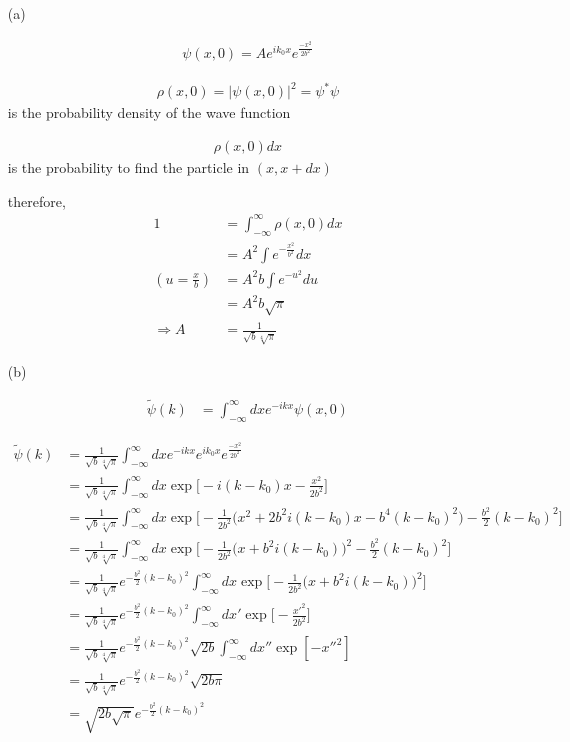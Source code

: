 \documentclass[11pt,a4paper]{article}
\begin{document}
\begin{enumerate}
\item[(a)]

\begin{align}
    \psi(x,0)=Ae^{ik_0x}e^{\frac{-x^2}{2b^2}}
\end{align}

\begin{align}
    \rho(x,0)=|\psi(x,0)|^2=\psi^*\psi
\end{align}
is the probability density of the wave function

\begin{align}
    \rho(x,0)dx
\end{align}
is the probability to find the particle in $(x,x+dx)$

therefore,
    \begin{align}
    1&=\int_{-\infty}^\infty\rho(x,0)dx\\
    &=A^2\int e^{-\frac{x^2}{b^2}}dx\\
    (u=\frac{x}{b})&=A^2b\int e^{-u^2}du\\
    &=A^2b\sqrt{\pi}\\
    \Rightarrow A&=\frac{1}{\sqrt{b}\sqrt[4]{\pi}}
\end{align}

\item[(b)]

\begin{align}
    \tilde{\psi}(k)&=\int^\infty_{-\infty} dx e^{-ikx}\psi(x,0)
\end{align}

\begin{align}
    \tilde{\psi}(k)
    &=\frac{1}{\sqrt{b}\sqrt[4]{\pi}}\int^\infty_{-\infty} dx e^{-ikx}e^{ik_0x}e^{\frac{-x^2}{2b^2}}\\
    &=\frac{1}{\sqrt{b}\sqrt[4]{\pi}}\int^\infty_{-\infty} dx \exp{\bigg[-i(k-k_0)x-\frac{x^2}{2b^2}\bigg]}\\
    &=\frac{1}{\sqrt{b}\sqrt[4]{\pi}}\int^\infty_{-\infty} dx \exp{\bigg[-\frac{1}{2b^2}\Big(x^2+2b^2i(k-k_0)x-b^4(k-k_0)^2\Big)-\frac{b^2}{2}(k-k_0)^2\bigg]}\\
    &=\frac{1}{\sqrt{b}\sqrt[4]{\pi}}\int^\infty_{-\infty} dx \exp{\bigg[-\frac{1}{2b^2}\Big(x+b^2i(k-k_0)\Big)^2-\frac{b^2}{2}(k-k_0)^2\bigg]}\\
    &=\frac{1}{\sqrt{b}\sqrt[4]{\pi}}e^{-\frac{b^2}{2}(k-k_0)^2}\int^\infty_{-\infty} dx \exp{\bigg[-\frac{1}{2b^2}\Big(x+b^2i(k-k_0)\Big)^2\bigg]}\\
    &=\frac{1}{\sqrt{b}\sqrt[4]{\pi}}e^{-\frac{b^2}{2}(k-k_0)^2}\int^\infty_{-\infty} dx' \exp{\bigg[-\frac{x'^2}{2b^2}\bigg]}\\
    &=\frac{1}{\sqrt{b}\sqrt[4]{\pi}}e^{-\frac{b^2}{2}(k-k_0)^2}\sqrt{2b}\int^\infty_{-\infty} dx'' \exp{[-x''^2]}\\
    &=\frac{1}{\sqrt{b}\sqrt[4]{\pi}}e^{-\frac{b^2}{2}(k-k_0)^2}\sqrt{2b\pi}\\
    &=\sqrt{2b\sqrt{\pi}}e^{-\frac{b^2}{2}(k-k_0)^2}
\end{align}


\end{enumerate}
\end{document}
